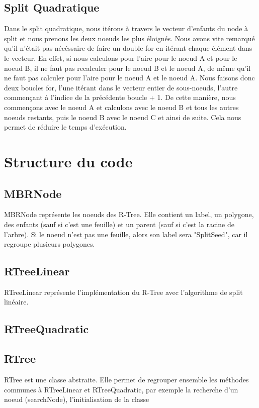 \documentclass[utf8]{article}
\begin{document}
\begin{large}
\subsection{Split Quadratique}
\par
\indent
Dans le split quadratique, nous itérons à travers le vecteur d'enfants du node à
split et nous prenons les deux noeuds les plus éloignés. Nous avons vite
remarqué qu'il n'était pas nécéssaire de faire un double for en itérant chaque
élément dans le vecteur. En effet, si nous calculons pour l'aire pour le noeud A
et pour le noeud B, il ne faut pas recalculer pour le noeud B et le noeud A, de
même qu'il ne faut pas calculer pour l'aire pour le noeud A et le noeud A. Nous
faisons donc deux boucles for, l'une itérant dans le vecteur entier de
sous-noeuds, l'autre commençant à l'indice de la précédente boucle + 1. De cette
manière, nous commençons avec le noeud A et calculons avec le noeud B et tous
les autres noeuds restants, puis le noeud B avec le noeud C et ainsi de suite.
Cela nous permet de réduire le temps d'exécution.
\par


\section{Structure du code}

\par
\subsection{MBRNode}
\par
\indent
MBRNode représente les noeuds des R-Tree. Elle contient un label, un polygone, 
des enfants (sauf si c'est une feuille) et un parent (sauf si c'est la racine de
l'arbre). Si le noeud n'est pas une feuille, alors son label sera "SplitSeed",
car il regroupe plusieurs polygones.

\subsection{RTreeLinear}\label{RTreeLinear}
\par
\indent
RTreeLinear représente l'implémentation du R-Tree avec l'algorithme de split linéaire.
\subsection{RTreeQuadratic}\label{RTreeQ}

\subsection{RTree}
\par
\indent
RTree est une classe abstraite. Elle permet de regrouper ensemble les méthodes
communes à RTreeLinear et RTreeQuadratic, par exemple la
recherche d'un noeud (searchNode), l'initialisation de la classe



\end{large}
\end{document}
